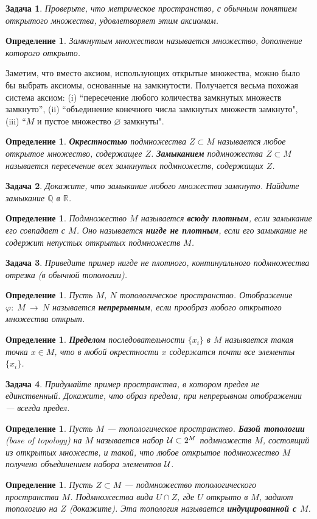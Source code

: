 \documentclass[12pt]{book}
\newcommand{\arrow}{{\:\longrightarrow\:}}
\renewcommand{\phi}{\varphi}
\renewcommand{\emptyset}{\varnothing}
\def\R{{\mathbb R}}
\def\Q{{\mathbb Q}}
\theoremstyle{upshape}
\newtheorem{zadacha}{Задача}[chapter]
\theoremstyle{generic}
\newtheorem{opredelenie}[teorema]{Определение}
\newtheorem{remark}[teorema]{Замечание}
\def\замечание{\begin{remark}}
\def\еза{\end{remark}}
\theoremstyle{upshapenonumber}
\newcommand{\следствие}{%
     \refstepcounter{teorema}
     {\noindent\bf Следствие \thechapter.\arabic{teorema}:\ }}
\newcommand{\пример}{%
     \refstepcounter{teorema}
     {\noindent\bf Пример \thechapter.\arabic{teorema}:\ }}
\newcommand{\лемма}{%
     \refstepcounter{teorema}
     {\noindent\bf Лемма \thechapter.\arabic{teorema}:\ }}
\newcommand{\теорема}{%
     \refstepcounter{teorema}
     {\noindent\bf Теорема \thechapter.\arabic{teorema}:\ }}
\newcommand{\утверждение}{%
     \refstepcounter{teorema}
     {\noindent\bf Утверждение \thechapter.\arabic{teorema}:\ }}
\def\бф{\bf}
\def\ем{\em}
\def\задача{\begin{zadacha}}
\def\ез{\end{zadacha}}
\def\еу{\end{ukazanie}}
\def\определение{\begin{opredelenie}}
\def\ео{\end{opredelenie}}
\def\енум{\begin{enumerate}}
\def\ее{\end{enumerate}}
\begin{document}
\задача
Проверьте, что метрическое пространство, с
обычным понятием открытого множества, удовлетворяет
этим аксиомам.
\ез

\определение
Замкнутым множеством называется множество, 
дополнение которого открыто.
\ео

Заметим, что вместо аксиом, использующих открытые
множества, можно было бы выбрать аксиомы, 
основанные на замкнутости. Получается весьма
похожая система аксиом: (i) ``пересечение любого количества
замкнутых множеств замкнуто'', (ii) ``объединение
конечного числа замкнутых множеств замкнуто",
(iii) ``$M$ и пустое множество $\emptyset$ замкнуты".

\определение
{\бф Окрестностью} подмножества $Z\subset M$ называется
любое открытое множество, содержащее $Z$. {\бф Замыканием}
подмножества $Z\subset M$ называется пересечение
всех замкнутых подмножеств, содержащих $Z$.
\ео

\задача
Докажите, что замыкание любого множества замкнуто.
Найдите замыкание $\Q$ в $\R$.
\ез

\определение
Подмножество $M$ называется {\бф всюду плотным},
если замыкание его совпадает с $M$. Оно называется
{\бф нигде не плотным}, если его замыкание
не содержит непустых открытых подмножеств $M$.
\ео

\задача
Приведите пример нигде не плотного, континуального
подмножества отрезка (в обычной топологии).
\ез

\определение
Пусть $M$, $N$ топологическое пространство.
Отображение $\phi:\; M \arrow N$ называется
{\бф непрерывным}, если прообраз любого открытого множества открыт.
\ео

\определение
{\бф Пределом} последовательности $\{x_i\}$ в $M$
называется такая точка $x\in M$, что в любой окрестности
$x$ содержатся почти все элементы $\{x_i\}$.
\ео

\задача
Придумайте пример пространства, в котором
предел не единственный. Докажите, что
образ предела, при непрерывном отображении --- всегда предел.
\ез

\определение
Пусть $M$ --- топологическое пространство.
{\бф Базой топологии} (base of topology) на $M$ называется
набор ${\cal U}\subset 2^M$ подмножеств $M$,
состоящий из открытых множеств, и такой,
что любое открытое подмножество $M$ получено
объединением набора элементов ${\cal U}$.
\ео

\определение
Пусть $Z\subset M$ --- подмножество топологического пространства 
$M$. Подмножества вида $U\cap Z$, где $U$ открыто в $M$,
задают топологию на $Z$ (докажите). Эта топология
называется {\бф индуцированной с $M$}.
\ео 
\end{document}
